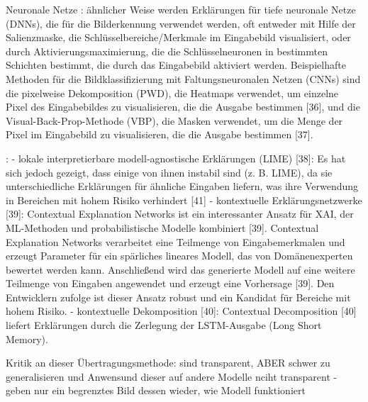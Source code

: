 Neuronale Netze \cite{westin2020building}: ähnlicher Weise werden Erklärungen für tiefe neuronale Netze (DNNs), die für die Bilderkennung verwendet werden, oft entweder mit Hilfe der Salienzmaske, die Schlüsselbereiche/Merkmale im Eingabebild visualisiert, oder durch Aktivierungsmaximierung, die die Schlüsselneuronen in bestimmten Schichten bestimmt, die durch das Eingabebild aktiviert werden. 
Beispielhafte Methoden für die Bildklassifizierung mit Faltungsneuronalen Netzen (CNNs) sind die pixelweise Dekomposition (PWD), die Heatmaps verwendet, um einzelne Pixel des Eingabebildes zu visualisieren, die die Ausgabe bestimmen [36], und die Visual-Back-Prop-Methode (VBP), die Masken verwendet, um die Menge der Pixel im Eingabebild zu visualisieren, die die Ausgabe bestimmen [37].

\cite{westin2020building}:
- lokale interpretierbare modell-agnostische Erklärungen (LIME) [38]: Es hat sich jedoch gezeigt, dass einige von ihnen instabil sind (z. B. LIME), da sie unterschiedliche Erklärungen für ähnliche Eingaben liefern, was ihre Verwendung in Bereichen mit hohem Risiko verhindert [41] 
- kontextuelle Erklärungsnetzwerke [39]: Contextual Explanation Networks ist ein interessanter Ansatz für XAI, der ML-Methoden und probabilistische Modelle kombiniert [39]. Contextual Explanation Networks verarbeitet eine Teilmenge von Eingabemerkmalen und erzeugt Parameter für ein spärliches lineares Modell, das von Domänenexperten bewertet werden kann. Anschließend wird das generierte Modell auf eine weitere Teilmenge von Eingaben angewendet und erzeugt eine Vorhersage [39]. Den Entwicklern zufolge ist dieser Ansatz robust und ein Kandidat für Bereiche mit hohem Risiko.
- kontextuelle Dekomposition [40]: Contextual Decomposition [40] liefert Erklärungen durch die Zerlegung der LSTM-Ausgabe (Long Short Memory).

Kritik an dieser Übertragungsmethode: \cite{krause2017workflow}
 sind transparent, ABER schwer zu generalisieren und Anwensund dieser auf andere Modelle nciht transparent - geben nur ein begrenztes Bild dessen wieder, wie Modell funktioniert